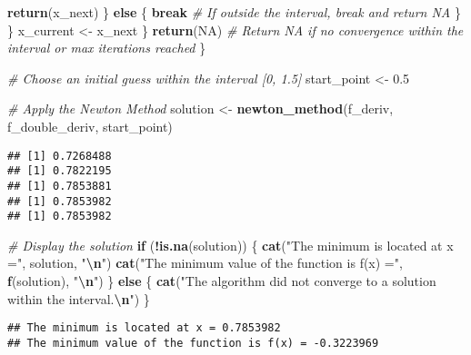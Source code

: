 \documentclass[
]{article}
\newenvironment{Shaded}{\begin{snugshade}}{\end{snugshade}}
\newcommand{\CommentTok}[1]{\textcolor[rgb]{0.56,0.35,0.01}{\textit{#1}}}
\newcommand{\ConstantTok}[1]{\textcolor[rgb]{0.56,0.35,0.01}{#1}}
\newcommand{\ControlFlowTok}[1]{\textcolor[rgb]{0.13,0.29,0.53}{\textbf{#1}}}
\newcommand{\FloatTok}[1]{\textcolor[rgb]{0.00,0.00,0.81}{#1}}
\newcommand{\FunctionTok}[1]{\textcolor[rgb]{0.13,0.29,0.53}{\textbf{#1}}}
\newcommand{\NormalTok}[1]{#1}
\newcommand{\OtherTok}[1]{\textcolor[rgb]{0.56,0.35,0.01}{#1}}
\newcommand{\SpecialCharTok}[1]{\textcolor[rgb]{0.81,0.36,0.00}{\textbf{#1}}}
\newcommand{\StringTok}[1]{\textcolor[rgb]{0.31,0.60,0.02}{#1}}
\begin{document}
\begin{Shaded}
\begin{Highlighting}[]
        \FunctionTok{return}\NormalTok{(x\_next)}
\NormalTok{      \} }\ControlFlowTok{else}\NormalTok{ \{}
        \ControlFlowTok{break} \CommentTok{\# If outside the interval, break and return NA}
\NormalTok{      \}}
\NormalTok{    \}}
\NormalTok{    x\_current }\OtherTok{\textless{}{-}}\NormalTok{ x\_next}
\NormalTok{  \}}
  \FunctionTok{return}\NormalTok{(}\ConstantTok{NA}\NormalTok{) }\CommentTok{\# Return NA if no convergence within the interval or max iterations reached}
\NormalTok{\}}

\CommentTok{\# Choose an initial guess within the interval [0, 1.5]}
\NormalTok{start\_point }\OtherTok{\textless{}{-}} \FloatTok{0.5}

\CommentTok{\# Apply the Newton Method}
\NormalTok{solution }\OtherTok{\textless{}{-}} \FunctionTok{newton\_method}\NormalTok{(f\_deriv, f\_double\_deriv, start\_point)}
\end{Highlighting}
\end{Shaded}

\begin{verbatim}
## [1] 0.7268488
## [1] 0.7822195
## [1] 0.7853881
## [1] 0.7853982
## [1] 0.7853982
\end{verbatim}

\begin{Shaded}
\begin{Highlighting}[]
\CommentTok{\# Display the solution}
\ControlFlowTok{if}\NormalTok{ (}\SpecialCharTok{!}\FunctionTok{is.na}\NormalTok{(solution)) \{}
  \FunctionTok{cat}\NormalTok{(}\StringTok{"The minimum is located at x ="}\NormalTok{, solution, }\StringTok{"}\SpecialCharTok{\textbackslash{}n}\StringTok{"}\NormalTok{)}
  \FunctionTok{cat}\NormalTok{(}\StringTok{"The minimum value of the function is f(x) ="}\NormalTok{, }\FunctionTok{f}\NormalTok{(solution), }\StringTok{"}\SpecialCharTok{\textbackslash{}n}\StringTok{"}\NormalTok{)}
\NormalTok{\} }\ControlFlowTok{else}\NormalTok{ \{}
  \FunctionTok{cat}\NormalTok{(}\StringTok{"The algorithm did not converge to a solution within the interval.}\SpecialCharTok{\textbackslash{}n}\StringTok{"}\NormalTok{)}
\NormalTok{\}}
\end{Highlighting}
\end{Shaded}

\begin{verbatim}
## The minimum is located at x = 0.7853982 
## The minimum value of the function is f(x) = -0.3223969
\end{verbatim}
\end{document}
